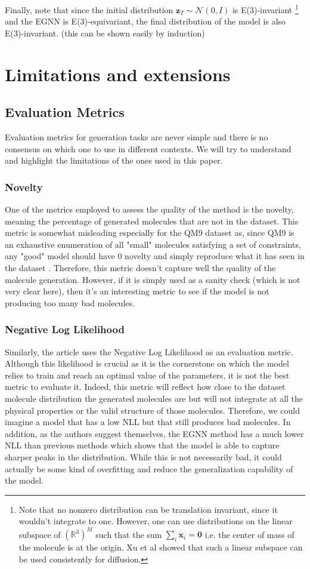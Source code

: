 \documentclass[sigconf]{acmart}
\begin{document}
Finally, note that since the initial distribution $\mathbf{z}_T \sim \mathcal{N}(0, I)$ is E(3)-invariant
\footnote{Note that no nonzero distribution can be translation invariant, since it wouldn't integrate to one. 
However, one can use distributions on the linear subspace of $(\mathbb{R}^3)^M$ such that the sum $\sum_i \mathbf{x}_i = \mathbf{0}$ i.e. the center of mass of the molecule is at the origin.
Xu et al \cite{xu} showed that such a linear subspace can be used consistently for diffusion.}
and the EGNN is E(3)-equivariant, the final distribution of the model is also E(3)-invariant. (this can be shown easily by induction)

\section{Limitations and extensions}
\subsection{Evaluation Metrics}
Evaluation metrics for generation tasks are never simple and there is no consensus on which one to use in different contexts. We will try to understand and highlight the limitations of the ones used in this paper.
\subsubsection{Novelty}
One of the metrics employed to assess the quality of the method is the novelty, meaning the percentage of generated molecules that are not in the dataset. This metric is somewhat misleading especially for the QM9 dataset as, since QM9 is an exhaustive enumeration of all "small" molecules satisfying a set of constraints, any "good" model should have 0 novelty and simply reproduce what it has seen in the dataset \cite{vignac2022topnequivariantsetgraph}. Therefore, this metric doesn't capture well the quality of the molecule generation. However, if it is simply used as a sanity check (which is not very clear here), then it's an interesting metric to see if the model is not producing too many bad molecules.
\subsubsection{Negative Log Likelihood}
Similarly, the article uses the Negative Log Likelihood as an evaluation metric. Although this likelihood is crucial as it is the cornerstone on which the model relies to train and reach an optimal value of the parameters, it is not the best metric to evaluate it. Indeed, this metric will reflect how close to the dataset molecule distribution the generated molecules are but will not integrate at all the physical properties or the valid structure of those molecules. Therefore, we could imagine a model that has a low NLL but that still produces bad molecules. In addition, as the authors suggest themselves, the EGNN method has a much lower NLL than previous methods which shows that the model is able to capture sharper peaks in the distribution. While this is not necessarily bad, it could actually be some kind of overfitting and reduce the generalization capability of the model.
\end{document}
